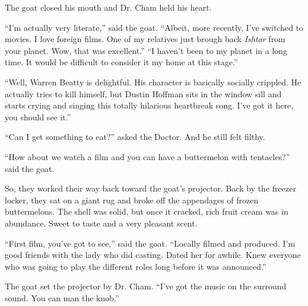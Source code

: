 \documentclass[10pt,twoside]{report}
\begin{document}
The goat closed his mouth and Dr. Cham held his heart.

``I'm actually very literate,'' said the goat.  ``Albeit, more
recently, I've switched to movies.  I love foreign films.  One of my
relatives just brough back {\em Ishtar} from your planet.  Wow, that
was excellent.''  ``I haven't been to my planet in a long time.  It
would be difficult to consider it my home at this stage.''

``Well, Warren Beatty is delightful.  His character is basically
socially crippled.  He actually tries to kill himself, but Dustin
Hoffman sits in the window sill and starts crying and singing this
totally hilarious heartbreak song.  I've got it here, you should see
it.''

``Can I get something to eat?'' asked the Doctor.  And he still felt
filthy.

``How about we watch a film and you can have a buttermelon with
tentacles?'' said the goat.

So, they worked their way back toward the goat's projector.  Back by
the freezer locker, they sat on a giant rug and broke off the
appendages of frozen buttermelons.  The shell was solid, but once it
cracked, rich fruit cream was in abundance.  Sweet to taste and a very
pleasant scent.

``First film, you've got to see,'' said the goat.  ``Locally filmed
and produced.  I'm good friends with the lady who did casting.  Dated
her for awhile.  Knew everyone who was going to play the different
roles long before it was announced.''

The goat set the projector by Dr. Cham.  ``I've got the music on the
surround sound. You can man the knob.''
\end{document}
